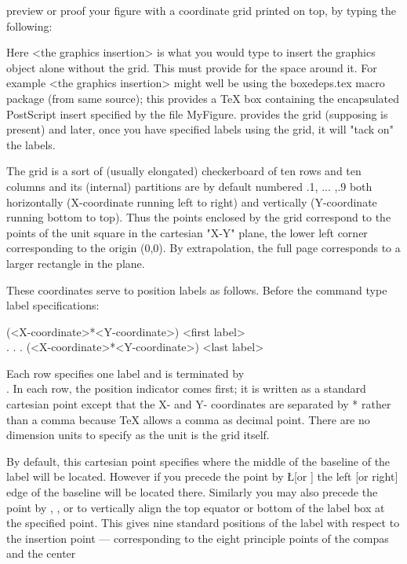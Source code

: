 preview or proof your figure with a coordinate grid printed on
top, by typing the following:

    \ShowGrid  %

Here <the graphics insertion> is what you would type to insert
the graphics object alone without the grid.  This must provide
for the space around it. For example <the graphics insertion>
might well be  using the
boxedeps.tex macro package (from same source); this provides a
TeX box containing the encapsulated PostScript insert specified by
the file MyFigure.  provides the grid (supposing
\ShowGrid is present) and later, once you have specified labels
using the grid, it will "tack on" the labels.

     The grid is a sort of (usually elongated) checkerboard of
ten rows and ten columns and its (internal) partitions are by
default numbered  .1, ... ,.9  both horizontally (X-coordinate
running left to right) and vertically (Y-coordinate running bottom
to top).  Thus the points enclosed by the grid correspond to the
points of the unit square in the cartesian "X-Y" plane, the lower
left corner corresponding to the origin (0,0).  By extrapolation,
the full page corresponds to a larger rectangle in the plane.

     These coordinates serve to position labels as follows.
Before the  command type label specifications:

  \SetLabels
   (<X-coordinate>*<Y-coordinate>) <first label> \\
   .
   .
   .
   (<X-coordinate>*<Y-coordinate>)  <last label> \\
  \endSetLabels

Each row specifies one label and is terminated by \\.  In each
row, the position indicator comes first; it is written as a
standard cartesian point except that the X- and Y- coordinates
are separated by * rather than a comma because TeX allows a
comma as decimal point. There are no dimension units to specify
as the unit is the grid itself.

     By default, this cartesian point specifies where the middle
of the baseline of the label will be located.  However if you precede
the point by \L [or \R] the left [or right] edge of the baseline will
be located there. Similarly you may also precede the point by \T, \E,
or \B to vertically align the top equator or bottom of the label box
at the specified point.  This gives nine standard positions of
the label with respect to the insertion point --- corresponding to
the eight principle points of the compas and the center

